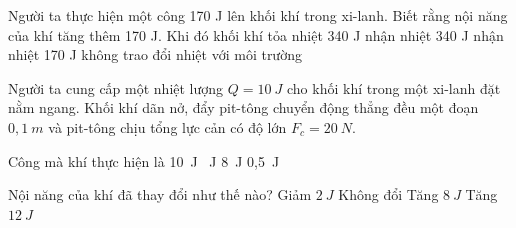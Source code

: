 \begin{vidu}%
Người ta thực hiện một công 170 J lên khối khí trong xi-lanh. Biết rằng nội năng của khí tăng thêm 170 J. Khi đó khối khí
\choice
{tỏa nhiệt 340 J}
{nhận nhiệt 340 J}
{nhận nhiệt 170 J}
{\True không trao đổi nhiệt với môi trường}
\end{vidu}
\begin{vidu}
Người ta cung cấp một nhiệt lượng $Q=10\ J$ cho khối khí trong một xi-lanh đặt nằm ngang. Khối khí dãn nở, đẩy pit-tông chuyển động thẳng đều một đoạn $0,1\ m$ và pit-tông chịu tổng lực cản có độ lớn $F_c=20\ N$.
\begin{vdc}
Công mà khí thực hiện là
\choice
{10\ J}
{\ J}
{8\ J}
{0,5\ J}

\end{vdc}
\begin{vdc}
Nội năng của khí đã thay đổi như thế nào?
\choice
{Giảm $2\ J$}
{Không đổi}
{\True Tăng $8\ J$}
{Tăng $12\ J$}

\end{vdc}
\end{vidu}



